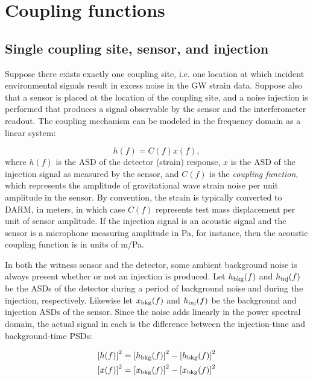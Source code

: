 \section{Coupling functions}\label{sec:cf}

\subsection{Single coupling site, sensor, and injection}

Suppose there exists exactly one coupling site, i.e. one location at which incident environmental signals result in excess noise in the \ac{GW} strain data.
Suppose also that a sensor is placed at the location of the coupling site, and a noise injection is performed that produces a signal observable by the sensor and the interferometer readout.
The coupling mechanism can be modeled in the frequency domain as a linear system:

\begin{equation}\label{eq:cf_model}
	h(f) = C(f) x(f),
\end{equation}
where $h(f)$ is the \ac{ASD} of the detector (strain) response, $x$ is the \ac{ASD} of the injection signal as measured by the sensor, and $C(f)$ is the \textit{coupling function}, which represents the amplitude of gravitational wave strain noise per unit amplitude in the sensor.
By convention, the strain is typically converted to \ac{DARM}, in meters, in which case $C(f)$ represents  test mass displacement per unit of sensor amplitude.
If the injection signal is an acoustic signal and the sensor is a microphone measuring amplitude in Pa, for instance, then the acoustic coupling function is in units of m/Pa.

In both the witness sensor and the detector, some ambient background noise is always present whether or not an injection is produced. Let $h_{\textrm{bkg}}(f)$ and $h_{\textrm{inj}}(f)$ be the \acp{ASD} of the detector during a period of background noise and during the injection, respectively. Likewise let $x_{\textrm{bkg}}(f)$ and $h_{\textrm{inj}}(f)$ be the background and injection \acp{ASD} of the sensor. Since the noise adds linearly in the power spectral domain, the actual signal in each is the difference between the injection-time and background-time \acp{PSD}:

\begin{align}
	\left[h(f)\right]^2 &= \left[h_{\textrm{bkg}}(f)\right]^2 - \left[h_{\textrm{bkg}}(f)\right]^2 \label{eq:h_inj}\\
	\left[x(f)\right]^2 &= \left[x_{\textrm{bkg}}(f)\right]^2 - \left[x_{\textrm{bkg}}(f)\right]^2 \label{eq:x_inj}
\end{align}

